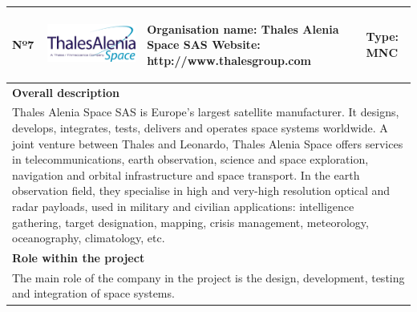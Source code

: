 \pagebreak
\begin{longtable}[H]{|p{0.7cm}|p{4cm}|p{7cm}|p{1.3cm}|}
	\hline
	\begin{center} Nº7 \end{center} & \begin{center} \includegraphics[scale=0.25]{./logos/Thales_Alenia_Space_Belgium_logo} \end{center} & \begin{center} \textbf{Organisation name:} Thales Alenia Space SAS \newline \textbf{Website:} http://www.thalesgroup.com \end{center} & \begin{center} Type: \newline MNC \end{center} \\ \hline
	
	\multicolumn{4}{|p{13cm}|}{\textbf{Overall description}}  \\ \hline
	
	\multicolumn{4}{|p{14.5cm}|}{Thales Alenia Space SAS is Europe's largest satellite manufacturer. It designs, develops, integrates, tests, delivers and operates space systems worldwide. A joint venture between Thales and Leonardo, Thales Alenia Space offers services in telecommunications, earth observation, science and space exploration, navigation and orbital infrastructure and space transport. In the earth observation field, they specialise in high and very-high resolution optical and radar payloads, used in military and civilian applications: intelligence gathering, target designation, mapping, crisis management, meteorology, oceanography, climatology, etc.}  \\ \hline
	
	\multicolumn{4}{|p{13cm}|}{\textbf{Role within the project}}   \\ \hline
	
	\multicolumn{4}{|p{14.5cm}|}{The main role of the company in the project is the design, development, testing and integration of space systems.}  \\ \hline
	

\end{longtable}

